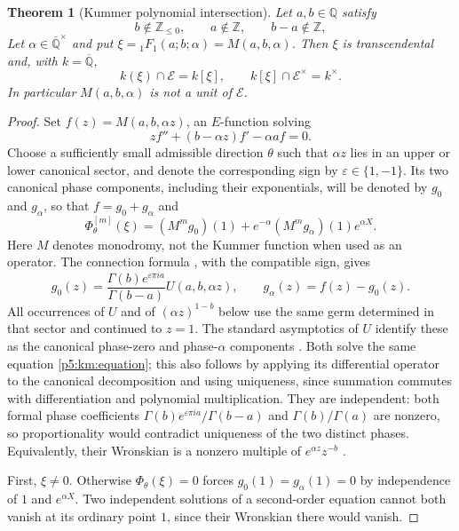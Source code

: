\documentclass[11pt,a4paper]{article}
\newtheorem{theorem}{Theorem}[section]
\theoremstyle{definition}
\theoremstyle{remark}
\numberwithin{equation}{section}
\begin{document}
\begin{theorem}[Kummer polynomial intersection]
\label{p5:km:intersection}
Let $a,b\in\mathbb Q$ satisfy
\[
 b\notin\mathbb Z_{\le0},\qquad a\notin\mathbb Z,
 \qquad b-a\notin\mathbb Z,
\]
Let $\alpha\in\overline{\mathbb Q}^{\times}$ and put
$\xi={}_1F_1(a;b;\alpha)=M(a,b,\alpha)$.  Then $\xi$ is
transcendental and, with $k=\overline{\mathbb Q}$,
\[
 k(\xi)\cap\mathcal E=k[\xi],\qquad
 k[\xi]\cap\mathcal E^\times=k^\times.
\]
In particular $M(a,b,\alpha)$ is not a unit of $\mathcal E$.
\end{theorem}
\begin{proof}
Set $f(z)=M(a,b,\alpha z)$, an $E$-function solving
\begin{equation}\label{p5:km:equation}
 zf''+(b-\alpha z)f'-\alpha af=0.
\end{equation}
Choose a sufficiently small admissible direction $\theta$ such that
$\alpha z$ lies in an upper or lower canonical sector, and denote
the corresponding sign by $\varepsilon\in\{1,-1\}$.  Its two canonical
phase components, including their exponentials, will be denoted by
$g_0$ and $g_\alpha$, so that $f=g_0+g_\alpha$ and
\[
 \Phi_\theta^{[m]}(\xi)
   =(M^m g_0)(1)+e^{-\alpha}(M^m g_\alpha)(1)e^{\alpha X}.
\]
Here $M$ denotes monodromy, not the Kummer function when used as an
operator.  The connection formula
\cite[13.2.41]{p5:DLMF}, with the compatible sign, gives
\begin{equation}\label{p5:km:components}
 g_0(z)=\frac{\Gamma(b)e^{\varepsilon\pi ia}}{\Gamma(b-a)}
             U(a,b,\alpha z),
 \qquad g_\alpha(z)=f(z)-g_0(z).
\end{equation}
All occurrences of $U$ and of $(\alpha z)^{1-b}$ below use the
same germ determined in that sector and continued to $z=1$.
The standard asymptotics of $U$ identify these as the canonical
phase-zero and phase-$\alpha$ components
\cite[13.7.2--13.7.3]{p5:DLMF}.  Both solve the same equation
\eqref{p5:km:equation}; this also follows by applying its differential
operator to the canonical decomposition and using uniqueness, since
summation commutes with differentiation and polynomial multiplication.
They are independent: both formal phase coefficients
$\Gamma(b)e^{\varepsilon\pi ia}/\Gamma(b-a)$ and $\Gamma(b)/\Gamma(a)$
are nonzero, so proportionality would contradict uniqueness of the
two distinct phases.  Equivalently, their Wronskian is a nonzero
multiple of $e^{\alpha z}z^{-b}$ \cite[13.2.38]{p5:DLMF}.

First, $\xi\ne0$.  Otherwise $\Phi_\theta(\xi)=0$ forces
$g_0(1)=g_\alpha(1)=0$ by independence of $1$ and $e^{\alpha X}$.
Two independent
solutions of a second-order equation cannot both vanish at its
ordinary point $1$, since their Wronskian there would vanish.


\end{proof}
\end{document}
